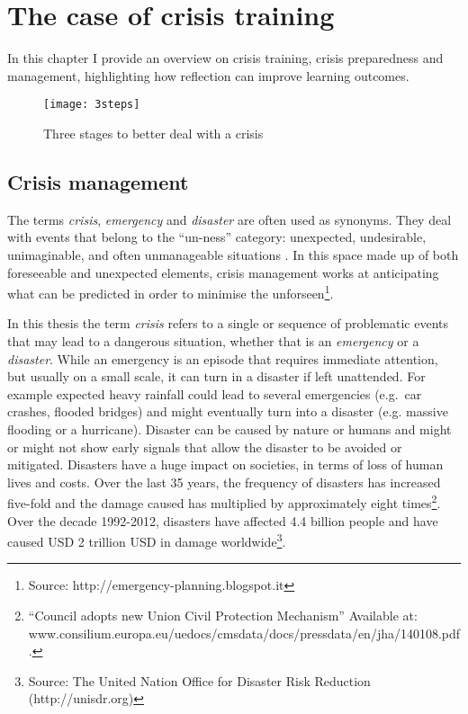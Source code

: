 \chapter{The case of crisis training}\label{crisis}


In this chapter I provide an overview on crisis training, crisis preparedness and management, highlighting how reflection can improve learning outcomes.
\begin{figure}
	[h!] \centering 
	\texttt{[image: 3steps]} \caption{Three stages to better deal with a crisis} \label{fig:three-stages} 
\end{figure}


\section{Crisis management}\label{crisis-management}

The terms \emph{crisis}, \emph{emergency} and \emph{disaster} are often used as synonyms. They deal with events that belong to the ``un-ness'' category: unexpected, undesirable, unimaginable, and often unmanageable situations \autocites{Boin:2007wt}{hewit}. In this space made up of both foreseeable and unexpected elements, crisis management works at anticipating what can be predicted in order to minimise the unforseen\footnote{Source: http://emergency-planning.blogspot.it}.

In this thesis the term \emph{crisis} refers to a single or sequence of problematic events that may lead to a dangerous situation, whether that is an \emph{emergency} or a \emph{disaster}. While an emergency is an episode that requires immediate attention, but usually on a small scale, it can turn in a disaster if left unattended. For example expected heavy rainfall could lead to several emergencies (e.g.~car crashes, flooded bridges) and might eventually turn into a disaster (e.g. massive flooding or a hurricane). Disaster can be caused by nature or humans and might or might not show early signals that allow the disaster to be avoided or mitigated. Disasters have a huge impact on societies, in terms of loss of human lives and costs. Over the last 35 years, the frequency of disasters has increased five-fold and the damage caused has multiplied by approximately eight times\footnote{``Council adopts new Union Civil Protection Mechanism'' Available at: www.consilium.europa.eu/uedocs/cmsdata/docs/pressdata/en/jha/140108.pdf.}. Over the decade 1992-2012, disasters have affected 4.4 billion people and have caused USD 2 trillion USD in damage worldwide\footnote{Source: The United Nation Office for Disaster Risk Reduction (http://unisdr.org)}.

